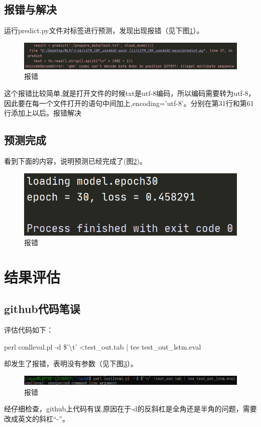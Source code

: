 \documentclass[12pt]{article}
\begin{document}
\subsection{报错与解决}
运行predict.py文件对标签进行预测，发现出现报错（见下图\ref{sssfqqqq}）。
\begin{figure}[H]
  \centering
  \includegraphics[scale=0.3]{./picture/error2.png} %
  \caption{报错} %
  \label{sssfqqqq} %
\end{figure}
这个报错比较简单,就是打开文件的时候txt是utf-8编码，所以编码需要转为utf-8，因此要在每一个文件打开的语句中间加上,encoding='utf-8'。分别在第31行和第61行添加上以后。报错解决
\subsection{预测完成}
看到下面的内容，说明预测已经完成了(图\ref{zzaa})。
\begin{figure}[H]
  \centering
  \includegraphics[scale=0.5]{./picture/predict.png} %
  \caption{报错} %
  \label{zzaa} %
\end{figure}

\section{结果评估}
\subsection{github代码笔误}
评估代码如下：\par
perl conlleval.pl -d \$'$\setminus$t' <test\_out.tab | tee test\_out\_lstm.eval\par
却发生了报错，表明没有参数（见下图\ref{asjhal}）。
\begin{figure}[H]
  \centering
  \includegraphics[scale=0.65]{./picture/error3.png} %
  \caption{报错} %
  \label{asjhal} %
\end{figure}
经仔细检查，github上代码有误,原因在于-d的反斜杠是全角还是半角的问题，需要改成英文的斜杠“-”。\par
\end{document}
